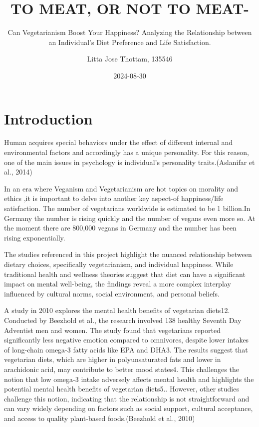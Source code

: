 \documentclass[
]{article}
\title{TO MEAT, OR NOT TO MEAT-}
\subtitle{Can Vegetarianism Boost Your Happiness? Analyzing the
Relationship between an Individual's Diet Preference and Life
Satisfaction.}
\author{Litta Jose Thottam, 135546}
\date{2024-08-30}
\begin{document}
\maketitle

{
\setcounter{tocdepth}{2}
\tableofcontents
}
\section{Introduction}\label{introduction}

Human acquires special behaviors under the effect of different internal
and environmental factors and accordingly has a unique personality. For
this reason, one of the main issues in psychology is individual's
personality traits.(Aslanifar et al., 2014)

In an era where Veganism and Vegetarianism are hot topics on morality
and ethics ,it is important to delve into another key aspect-of
happiness/life satisfaction. The number of vegetarians worldwide is
estimated to be 1 billion.In Germany the number is rising quickly and
the number of vegans even more so. At the moment there are 800,000
vegans in Germany and the number has been rising exponentially.

The studies referenced in this project highlight the nuanced
relationship between dietary choices, specifically vegetarianism, and
individual happiness. While traditional health and wellness theories
suggest that diet can have a significant impact on mental well-being,
the findings reveal a more complex interplay influenced by cultural
norms, social environment, and personal beliefs.

A study in 2010 explores the mental health benefits of vegetarian
diets12. Conducted by Beezhold et al., the research involved 138 healthy
Seventh Day Adventist men and women. The study found that vegetarians
reported significantly less negative emotion compared to omnivores,
despite lower intakes of long-chain omega-3 fatty acids like EPA and
DHA3. The results suggest that vegetarian diets, which are higher in
polyunsaturated fats and lower in arachidonic acid, may contribute to
better mood states4. This challenges the notion that low omega-3 intake
adversely affects mental health and highlights the potential mental
health benefits of vegetarian diets5.. However, other studies challenge
this notion, indicating that the relationship is not straightforward and
can vary widely depending on factors such as social support, cultural
acceptance, and access to quality plant-based foods.(Beezhold et al.,
2010)
\end{document}
